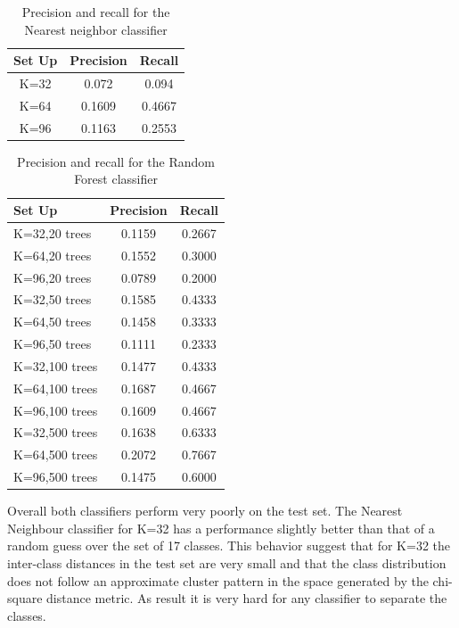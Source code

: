 \documentclass[10pt,twocolumn,letterpaper]{article}
\begin{document}
\begin{table}[ht!]
\centering
\begin{tabular}{c | c | c}
Set Up & Precision & Recall   \\
\hline	
K=32 & 0.072 & 0.094 \\
K=64 & 0.1609 & 0.4667 \\
K=96 &  0.1163&  0.2553 \\

\end{tabular}
\caption{Precision and recall for the Nearest neighbor classifier}
\label{table:table1}
\end{table}


\begin{table}[ht!]
\centering
\begin{tabular}{ l | c | c}
Set Up & Precision & Recall   \\
\hline	
K=32,20 trees & 0.1159 & 0.2667 \\
K=64,20 trees & 0.1552 & 0.3000 \\
K=96,20 trees & 0.0789  &  0.2000 \\
K=32,50 trees & 0.1585 & 0.4333 \\
K=64,50 trees & 0.1458 & 0.3333 \\
K=96,50 trees &  0.1111 &  0.2333\\
K=32,100 trees & 0.1477 & 0.4333  \\
K=64,100 trees & 0.1687 & 0.4667  \\
K=96,100 trees & 0.1609 &  0.4667\\
K=32,500 trees & 0.1638 & 0.6333  \\
K=64,500 trees & 0.2072  &  0.7667 \\
K=96,500 trees & 0.1475 & 0.6000  \\

\end{tabular}
\caption{Precision and recall for the Random Forest classifier}
\label{table:table2}
\end{table}


Overall both classifiers perform very poorly on the test set. The Nearest Neighbour classifier for K=32 has a performance slightly better than that of a random guess over the set of 17 classes. This behavior suggest that for K=32 the inter-class distances in the test set are very small and that the class distribution does not follow an approximate cluster pattern in the space generated by the chi-square distance metric. As result it is very hard for any classifier to separate the classes.
\end{document}
